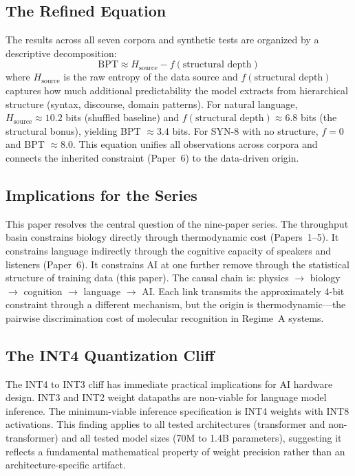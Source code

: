 \documentclass[11pt]{article}
\begin{document}
\subsection{The Refined Equation}

The results across all seven corpora and synthetic tests are organized by a descriptive decomposition:
\begin{equation}
\mathrm{BPT} \approx H_{\mathrm{source}} - f(\text{structural depth})
\end{equation}
where $H_{\mathrm{source}}$ is the raw entropy of the data source and $f(\text{structural depth})$ captures how much additional predictability the model extracts from hierarchical structure (syntax, discourse, domain patterns). For natural language, $H_{\mathrm{source}} \approx 10.2$ bits (shuffled baseline) and $f(\text{structural depth}) \approx 6.8$ bits (the structural bonus), yielding BPT $\approx 3.4$ bits. For SYN-8 with no structure, $f = 0$ and BPT $\approx 8.0$. This equation unifies all observations across corpora and connects the inherited constraint (Paper~6) to the data-driven origin.

\subsection{Implications for the Series}

This paper resolves the central question of the nine-paper series. The throughput basin constrains biology directly through thermodynamic cost (Papers~1--5). It constrains language indirectly through the cognitive capacity of speakers and listeners (Paper~6). It constrains AI at one further remove through the statistical structure of training data (this paper). The causal chain is: physics $\to$ biology $\to$ cognition $\to$ language $\to$ AI. Each link transmits the approximately 4-bit constraint through a different mechanism, but the origin is thermodynamic---the pairwise discrimination cost of molecular recognition in Regime~A systems.

\subsection{The INT4 Quantization Cliff}

The INT4 to INT3 cliff has immediate practical implications for AI hardware design. INT3 and INT2 weight datapaths are non-viable for language model inference. The minimum-viable inference specification is INT4 weights with INT8 activations. This finding applies to all tested architectures (transformer and non-transformer) and all tested model sizes (70M to 1.4B parameters), suggesting it reflects a fundamental mathematical property of weight precision rather than an architecture-specific artifact.
\end{document}
